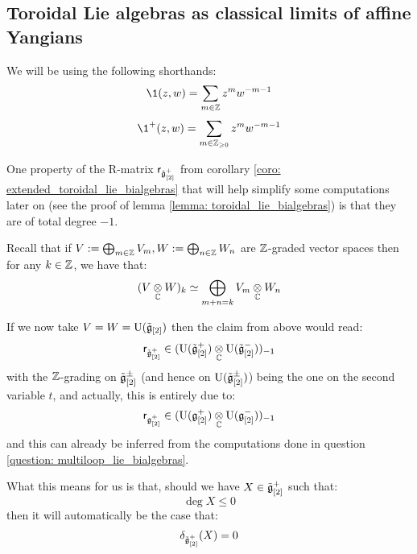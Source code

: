         \subsection{Toroidal Lie algebras as classical limits of affine Yangians}
            \begin{convention}
                We will be using the following shorthands:
                    $$\1(z, w) = \sum_{m \in \Z} z^m w^{-m - 1}$$
                    $$\1^+(z, w) = \sum_{m \in \Z_{\geq 0}} z^m w^{-m - 1}$$
            \end{convention}

            \begin{remark} \label{remark: total_degrees_of_classical_yangian_R_matrices}
                One property of the R-matrix $\mathsf{r}_{\hat{\mathfrak{g}}_{[2]}^+}$ from corollary \ref{coro: extended_toroidal_lie_bialgebras} that will help simplify some computations later on (see the proof of lemma \ref{lemma: toroidal_lie_bialgebras}) is that they are of total degree $-1$. 

                Recall that if $V := \bigoplus_{m \in \mathbb{Z}} V_m, W := \bigoplus_{n \in \mathbb{Z}} W_n$ are $\mathbb{Z}$-graded vector spaces then for any $k \in \mathbb{Z}$, we have that:
                    $$(V \tensor_{\bbC} W)_k \cong \bigoplus_{m + n = k} V_m \tensor_{\bbC} W_n$$
                    
                If we now take $V = W = \mathrm{U}(\tilde{\mathfrak{g}}_{[2]})$ then the claim from above would read:
                    $$\sfr_{\tilde{\g}_{[2]}^+} \in ( \rmU(\tilde{\g}_{[2]}^+) \tensor_{\bbC} \rmU(\tilde{\g}_{[2]}^-) )_{-1}$$
                with the $\mathbb{Z}$-grading on $\tilde{\mathfrak{g}}_{[2]}^{\pm}$ (and hence on $\mathrm{U}(\tilde{\mathfrak{g}}_{[2]}^{\pm})$) being the one on the second variable $t$, and actually, this is entirely due to:
                    $$\sfr_{\g_{[2]}^+} \in ( \rmU(\g_{[2]}^+) \tensor_{\bbC} \rmU(\g_{[2]}^-) )_{-1}$$
                and this can already be inferred from the computations done in question \ref{question: multiloop_lie_bialgebras}.

                What this means for us is that, should we have $X \in \tilde{\mathfrak{g}}_{[2]}^+$ such that:
                    $$\deg X \leq 0$$
                then it will automatically be the case that:
                    $$\delta_{\tilde{\mathfrak{g}}_{[2]}^+}(X) = 0$$
            \end{remark}
            
